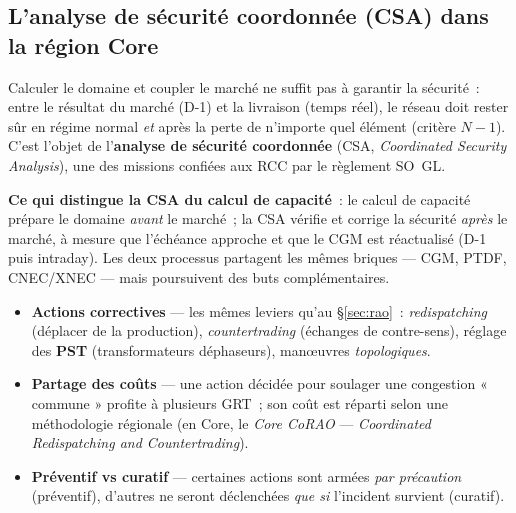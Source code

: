 \documentclass[11pt,a4paper]{article}
\begin{document}
\subsection{L'analyse de sécurité coordonnée (CSA) dans la région Core}
\label{sec:csa}

Calculer le domaine et coupler le marché ne suffit pas à garantir la
sécurité~: entre le résultat du marché (D-1) et la livraison (temps réel), le
réseau doit rester sûr en régime normal \emph{et} après la perte de n'importe
quel élément (critère $N\!-\!1$). C'est l'objet de l'\textbf{analyse de
sécurité coordonnée} (CSA, \emph{Coordinated Security Analysis}), une des
missions confiées aux RCC par le règlement SO~GL.

\begin{center}
\end{center}

\noindent\textbf{Ce qui distingue la CSA du calcul de capacité}~: le calcul de
capacité prépare le domaine \emph{avant} le marché~; la CSA vérifie et corrige
la sécurité \emph{après} le marché, à mesure que l'échéance approche et que le
CGM est réactualisé (D-1 puis intraday). Les deux processus partagent les
mêmes briques — CGM, PTDF, CNEC/XNEC — mais poursuivent des buts
complémentaires.

\begin{itemize}[nosep,leftmargin=1.4em]
  \item \textbf{Actions correctives} — les mêmes leviers qu'au
        \S\ref{sec:rao}~: \emph{redispatching} (déplacer de la production),
        \emph{countertrading} (échanges de contre-sens), réglage des
        \textbf{PST} (transformateurs déphaseurs), man\oe{}uvres
        \emph{topologiques}.
  \item \textbf{Partage des coûts} — une action décidée pour soulager une
        congestion « commune » profite à plusieurs GRT~; son coût est réparti
        selon une méthodologie régionale (en Core, le \emph{Core CoRAO} —
        \emph{Coordinated Redispatching and Countertrading}).
  \item \textbf{Préventif vs curatif} — certaines actions sont armées
        \emph{par précaution} (préventif), d'autres ne seront déclenchées
        \emph{que si} l'incident survient (curatif).
\end{itemize}
\end{document}
